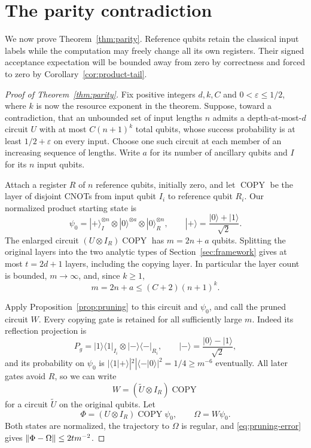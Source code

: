 \section{The parity contradiction}\label{sec:parity}

We now prove Theorem~\ref{thm:parity}.  Reference qubits retain the
classical input labels while the computation may freely change all
its own registers.  Their signed acceptance expectation will be
bounded away from zero by correctness and forced to zero by
Corollary~\ref{cor:product-tail}.

\begin{proof}[Proof of Theorem~\ref{thm:parity}]
Fix positive integers $d,k,C$ and $0<\varepsilon\le1/2$, where $k$ is
now the resource exponent in the theorem. Suppose, toward a contradiction, that an unbounded
set of input lengths $n$ admits a depth-at-most-$d$ circuit $U$ with
at most $C(n+1)^k$ total qubits,
whose success probability is at least $1/2+\varepsilon$ on every input. Choose
one such circuit at each member of an increasing sequence of lengths.
Write $a$ for its number of ancillary qubits and $I$ for its $n$
input qubits.

Attach a register $R$ of $n$ reference qubits, initially zero, and
let $\operatorname{COPY}$ be the layer of disjoint CNOTs from input
qubit $I_i$ to reference qubit $R_i$.  Our normalized product starting
state is
\[
 \psi_0=|+\rangle_I^{\otimes n}
          \otimes|0\rangle^{\otimes a}
          \otimes|0\rangle_R^{\otimes n},
 \qquad |+\rangle=\frac{|0\rangle+|1\rangle}{\sqrt2}.
\]
The enlarged circuit $(U\otimes I_R)\operatorname{COPY}$ has
$m=2n+a$ qubits.  Splitting the original layers into the two analytic
types of Section~\ref{sec:framework} gives at most $t=2d+1$ layers,
including the copying layer.  In particular the layer count is
bounded, $m\to\infty$, and, since $k\ge1$,
\begin{equation}\label{eq:parity-resources}
 m=2n+a\le(C+2)(n+1)^k.
\end{equation}

Apply Proposition~\ref{prop:pruning} to this circuit and $\psi_0$,
and call the pruned circuit $W$.  Every copying gate is retained for
all sufficiently large $m$.  Indeed its reflection projection is
\[
 P_g=|1\rangle\langle1|_{I_i}
       \otimes|-\rangle\langle-|_{R_i},
 \qquad |-\rangle=\frac{|0\rangle-|1\rangle}{\sqrt2},
\]
and its probability on $\psi_0$ is
$|\langle1|+\rangle|^2|\langle-|0\rangle|^2=1/4\ge m^{-6}$
eventually.  All later gates avoid $R$, so we can write
\[
 W=(\widetilde U\otimes I_R)\operatorname{COPY}
\]
for a circuit $\widetilde U$ on the original qubits.  Let
\[
 \Phi=(U\otimes I_R)\operatorname{COPY}\psi_0,
 \qquad \Omega=W\psi_0.
\]
Both states are normalized, the trajectory to $\Omega$ is regular,
and \eqref{eq:pruning-error} gives
$\lVert\Phi-\Omega\rVert\le2t m^{-2}$.


\end{proof}
